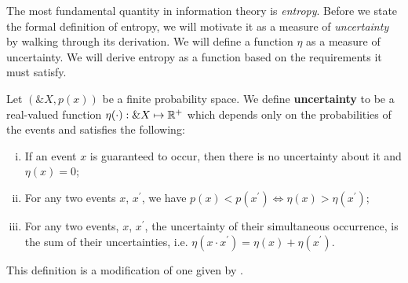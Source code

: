 The most fundamental quantity in information theory is
\textit{entropy}. Before we state the formal definition of entropy, we
will motivate it as a measure of \textit{uncertainty} by walking
through its derivation. We will define a function $\eta$ as a measure
of uncertainty. We will derive entropy as a function based on the
requirements it must satisfy.

\begin{definition}
  Let $(\&X, p(x))$ be a finite probability space. We define
  \textbf{uncertainty} to be a real-valued function $\eta(\cdot): \&X \mapsto
  \mathbb{R}^+$ which depends only on the probabilities of the events and satisfies the
  following:
  \begin{enumerate}[(i)]
  \item If an event $x$ is guaranteed to occur, then there is no uncertainty
    about it and $\eta(x) = 0$;
  \item For any two events $x$, $x^\prime$, we have $p(x) < p(x^\prime) \iff
    \eta(x) > \eta(x^\prime)$;
  \item For any two events, $x$, $x^\prime$, the uncertainty of their
    simultaneous occurrence, is the sum of their uncertainties, i.e. $\eta(x
    \cdot x^\prime) = \eta(x) + \eta(x^\prime)$.
  \end{enumerate}
\end{definition}
\begin{remark}
  This definition is a modification of one given by \cite{ref:martin-2011}.
\end{remark}

